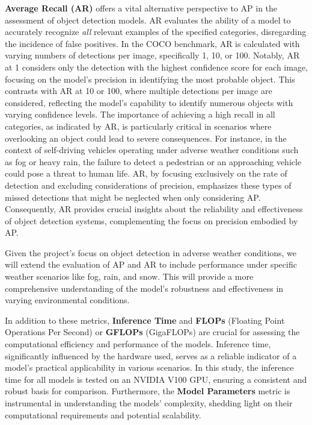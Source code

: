\documentclass[report.tex]{subfiles}
\begin{document}
    \textbf{Average Recall (AR)} offers a vital alternative perspective to AP in the assessment of object detection models. AR evaluates the ability of a model to accurately recognize \textit{all} relevant examples of the specified categories, disregarding the incidence of false positives. In the COCO benchmark, AR is calculated with varying numbers of detections per image, specifically 1, 10, or 100. Notably, AR at 1 considers only the detection with the highest confidence score for each image, focusing on the model's precision in identifying the most probable object. This contrasts with AR at 10 or 100, where multiple detections per image are considered, reflecting the model's capability to identify numerous objects with varying confidence levels. The importance of achieving a high recall in all categories, as indicated by AR, is particularly critical in scenarios where overlooking an object could lead to severe consequences. For instance, in the context of self-driving vehicles operating under adverse weather conditions such as fog or heavy rain, the failure to detect a pedestrian or an approaching vehicle could pose a threat to human life. AR, by focusing exclusively on the rate of detection and excluding considerations of precision, emphasizes these types of missed detections that might be neglected when only considering AP. Consequently, AR provides crucial insights about the reliability and effectiveness of object detection systems, complementing the focus on precision embodied by AP.

    Given the project's focus on object detection in adverse weather conditions, we will extend the evaluation of AP and AR to include performance under specific weather scenarios like fog, rain, and snow. This will provide a more comprehensive understanding of the model's robustness and effectiveness in varying environmental conditions.

    In addition to these metrics, \textbf{Inference Time} and \textbf{FLOPs} (Floating Point Operations Per Second) or \textbf{GFLOPs} (GigaFLOPs) are crucial for assessing the computational efficiency and performance of the models. Inference time, significantly influenced by the hardware used, serves as a reliable indicator of a model's practical applicability in various scenarios. In this study, the inference time for all models is tested on an NVIDIA V100 GPU, ensuring a consistent and robust basis for comparison. Furthermore, the \textbf{Model Parameters} metric is instrumental in understanding the models' complexity, shedding light on their computational requirements and potential scalability.
\end{document}
